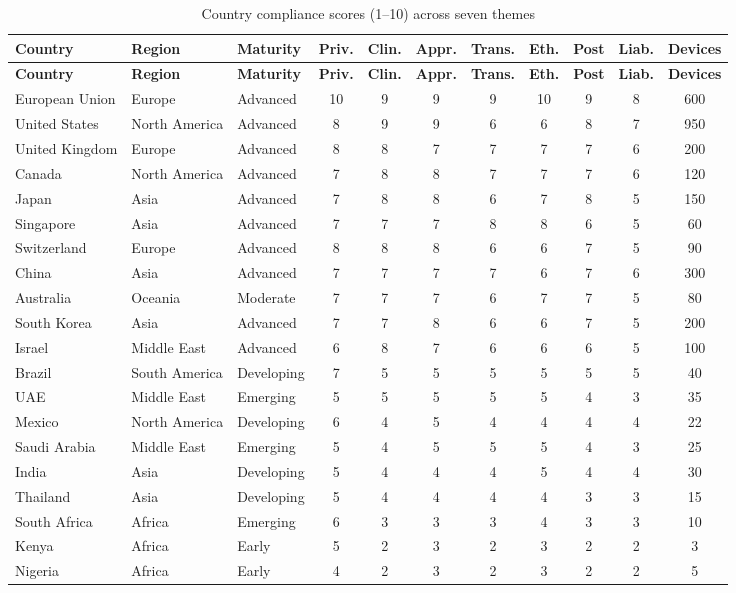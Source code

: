 \begin{longtable}{@{}l l l c c c c c c c c@{}}
\caption[Country compliance scores]{Country compliance scores (1--10) across seven themes} \label{tab:country-scores} \\
\toprule
\textbf{Country} & \textbf{Region} & \textbf{Maturity} & \textbf{Priv.} & \textbf{Clin.} & \textbf{Appr.} & \textbf{Trans.} & \textbf{Eth.} & \textbf{Post} & \textbf{Liab.} & \textbf{Devices} \\
\midrule
\endfirsthead
\toprule
\textbf{Country} & \textbf{Region} & \textbf{Maturity} & \textbf{Priv.} & \textbf{Clin.} & \textbf{Appr.} & \textbf{Trans.} & \textbf{Eth.} & \textbf{Post} & \textbf{Liab.} & \textbf{Devices} \\
\midrule
\endhead
\bottomrule
\endfoot
European Union & Europe & Advanced & 10 & 9 & 9 & 9 & 10 & 9 & 8 & 600 \\
United States & North America & Advanced & 8 & 9 & 9 & 6 & 6 & 8 & 7 & 950 \\
United Kingdom & Europe & Advanced & 8 & 8 & 7 & 7 & 7 & 7 & 6 & 200 \\
Canada & North America & Advanced & 7 & 8 & 8 & 7 & 7 & 7 & 6 & 120 \\
Japan & Asia & Advanced & 7 & 8 & 8 & 6 & 7 & 8 & 5 & 150 \\
Singapore & Asia & Advanced & 7 & 7 & 7 & 8 & 8 & 6 & 5 & 60 \\
Switzerland & Europe & Advanced & 8 & 8 & 8 & 6 & 6 & 7 & 5 & 90 \\
China & Asia & Advanced & 7 & 7 & 7 & 7 & 6 & 7 & 6 & 300 \\
Australia & Oceania & Moderate & 7 & 7 & 7 & 6 & 7 & 7 & 5 & 80 \\
South Korea & Asia & Advanced & 7 & 7 & 8 & 6 & 6 & 7 & 5 & 200 \\
Israel & Middle East & Advanced & 6 & 8 & 7 & 6 & 6 & 6 & 5 & 100 \\
Brazil & South America & Developing & 7 & 5 & 5 & 5 & 5 & 5 & 5 & 40 \\
UAE & Middle East & Emerging & 5 & 5 & 5 & 5 & 5 & 4 & 3 & 35 \\
Mexico & North America & Developing & 6 & 4 & 5 & 4 & 4 & 4 & 4 & 22 \\
Saudi Arabia & Middle East & Emerging & 5 & 4 & 5 & 5 & 5 & 4 & 3 & 25 \\
India & Asia & Developing & 5 & 4 & 4 & 4 & 5 & 4 & 4 & 30 \\
Thailand & Asia & Developing & 5 & 4 & 4 & 4 & 4 & 3 & 3 & 15 \\
South Africa & Africa & Emerging & 6 & 3 & 3 & 3 & 4 & 3 & 3 & 10 \\
Kenya & Africa & Early & 5 & 2 & 3 & 2 & 3 & 2 & 2 & 3 \\
Nigeria & Africa & Early & 4 & 2 & 3 & 2 & 3 & 2 & 2 & 5 \\
\end{longtable}